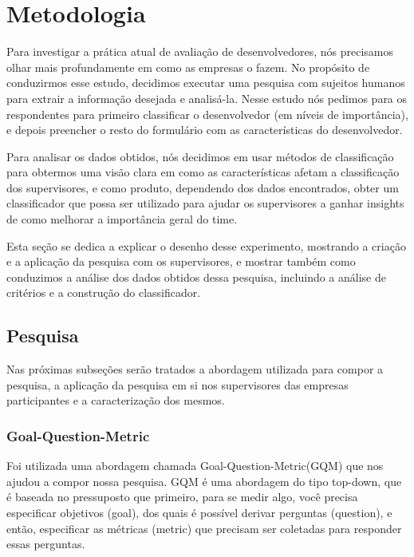 \chapter[Metodolodia]{Metodologia}

Para investigar a prática atual de avaliação de desenvolvedores, nós precisamos olhar mais profundamente em como as empresas o fazem. No propósito de conduzirmos esse estudo, decidimos executar uma pesquisa com sujeitos humanos para extrair a informação desejada e analisá-la. Nesse estudo nós pedimos para os respondentes para primeiro classificar o desenvolvedor (em níveis de importância), e depois preencher o resto do formulário com as características do desenvolvedor.

Para analisar os dados obtidos, nós decidimos em usar métodos de classificação para obtermos uma visão clara em como as características afetam a classificação dos supervisores, e como produto, dependendo dos dados encontrados, obter um classificador que possa ser utilizado para ajudar os supervisores a ganhar insights de como melhorar a importância geral do time.

Esta seção se dedica a explicar o desenho desse experimento, mostrando a criação e a aplicação da pesquisa com os supervisores, e mostrar também como conduzimos a análise dos dados obtidos dessa pesquisa, incluindo a análise de critérios e a construção do classificador.

\section{Pesquisa}\label{secao3.2}

Nas próximas subseções serão tratados a abordagem utilizada para compor a pesquisa, a aplicação da pesquisa em si nos supervisores das empresas participantes e a caracterização dos mesmos.

\subsection{Goal-Question-Metric}\label{secao3.2.1}
Foi utilizada uma abordagem chamada Goal-Question-Metric(GQM) \cite{Basili1994} que nos ajudou a compor nossa pesquisa. GQM é uma abordagem do tipo top-down, que é baseada no pressuposto que primeiro, para se medir algo, você precisa especificar objetivos (goal), dos quais é possível derivar perguntas (question), e então, especificar as métricas (metric) que precisam ser coletadas para responder essas perguntas.

